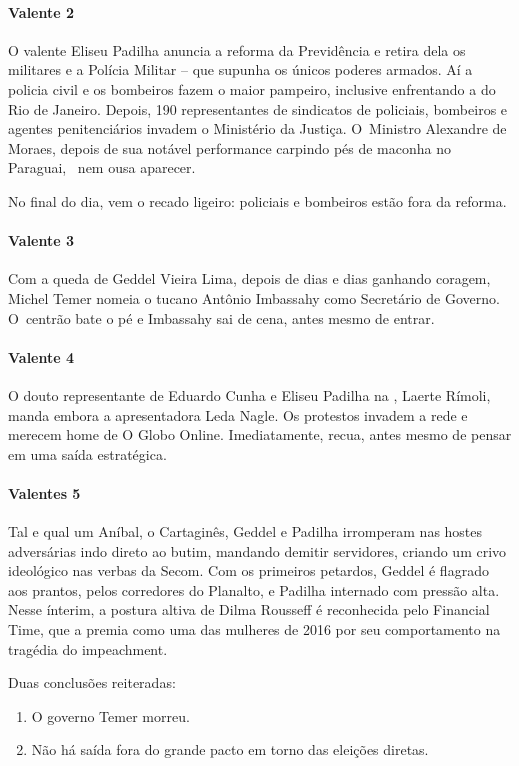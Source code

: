 \paragraph{\textbf{Valente 2}~}

O valente Eliseu Padilha anuncia a reforma da Previdência e retira dela
os militares e a Polícia Militar -- que supunha os únicos poderes
armados. Aí a policia civil e os bombeiros fazem o maior pampeiro,
inclusive enfrentando a  do Rio de Janeiro. Depois, 190 representantes
de sindicatos de policiais, bombeiros e agentes penitenciários invadem o
Ministério da Justiça. O~Ministro Alexandre de Moraes, depois de sua
notável performance carpindo pés de maconha no Paraguai, ~nem ousa
aparecer.

No final do dia, vem o recado ligeiro: policiais e bombeiros estão fora
da reforma.

\paragraph{\textbf{Valente 3}~}

Com a queda de Geddel Vieira Lima, depois de dias e dias ganhando
coragem, Michel Temer nomeia o tucano Antônio Imbassahy como Secretário
de Governo. O~centrão bate o pé e Imbassahy sai de cena, antes mesmo de
entrar.

\paragraph{\textbf{Valente 4}~}

O douto representante de Eduardo Cunha e Eliseu Padilha na , Laerte
Rímoli, manda embora a apresentadora Leda Nagle. Os protestos invadem a
rede e merecem home de O Globo Online. Imediatamente, recua, antes mesmo
de pensar em uma saída estratégica.

\paragraph{\textbf{Valentes 5}~}

Tal e qual um Aníbal, o Cartaginês, Geddel e Padilha irromperam nas
hostes adversárias indo direto ao butim, mandando demitir servidores,
criando um crivo ideológico nas verbas da Secom. Com os primeiros
petardos, Geddel é flagrado aos prantos, pelos corredores do Planalto, e
Padilha internado com pressão alta. Nesse ínterim, a postura altiva de
Dilma Rousseff é reconhecida pelo Financial Time, que a premia como uma
das mulheres de 2016 por seu comportamento na tragédia do impeachment.

Duas conclusões reiteradas:

\begin{enumerate}
\itemsep1pt\parskip0pt
\item
  O governo Temer morreu.
\item
  Não há saída fora do grande pacto em torno das eleições diretas.
\end{enumerate}
